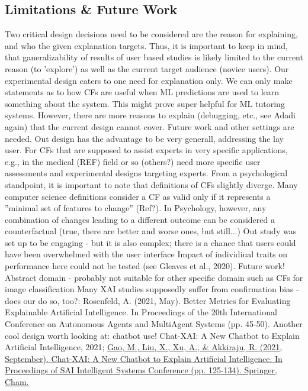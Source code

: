 \subsection{Limitations \& Future Work}\label{subsec:limitations-future-work}
\textcolor{ACMDarkBlue}{
Two critical design decisions need to be considered are the reason for explaining, and who the given explanation targets. Thus, it is important to keep in mind, that ganeralizability of results of user based studies is likely limited to the current reason (to 'explore') as well as the current target audience (novice users). 
Our experimental design caters to one need for explanation only. 
We can only make statements as to how CFs are useful when ML predictions are used to learn something about the system. 
This might prove super helpful for ML tutoring systems. 
However, there are more reasons to explain (debugging, etc., see Adadi again) that the current design cannot cover. Future work and other settings are needed.
} \textcolor{ACMDarkBlue}{
Out design has the advantage to be very generall, addressing the lay user. For CFs that are supposed to assist experts in very specific applications, e.g., in the medical (REF) field or so (others?) need more specific user assessments and experimental designs targeting experts.
} \textcolor{ACMDarkBlue}{
From a psychological standpoint, it is important to note that definitions of CFs slightly diverge. Many computer science definitions consider a CF as valid only if it represents a ''minimal set of features to change'' (Ref?). In Psychology, however, any combination of changes leading to a different outcome can be considered a counterfactual (true, there are better and worse ones, but still...)
} \textcolor{ACMDarkBlue}{
Out study was set up to be engaging - but it is also complex; there is a chance that users could have been overwhelmed with the user interface
} \textcolor{ACMDarkBlue}{
Impact of individiual traits on performance here could not be tested (see Gleaves et al., 2020). Future work!
} \textcolor{ACMDarkBlue}{
Abstract domain - probably not suitable for other specific domain such as CFs for image classification
} \textcolor{ACMDarkBlue}{
Many XAI studies supposedly suffer from confirmation bias - does our do so, too?: Rosenfeld, A. (2021, May). Better Metrics for Evaluating Explainable Artificial Intelligence. In Proceedings of the 20th International Conference on Autonomous Agents and MultiAgent Systems (pp. 45-50).
} \textcolor{ACMDarkBlue}{
Another cool design worth looking at: chatbot use! Chat-XAI: A New Chatbot to Explain Artificial Intelligence, 2021; \url{Gao, M., Liu, X., Xu, A., \& Akkiraju, R. (2021, September). Chat-XAI: A New Chatbot to Explain Artificial Intelligence. In Proceedings of SAI Intelligent Systems Conference (pp. 125-134). Springer, Cham.}
}
